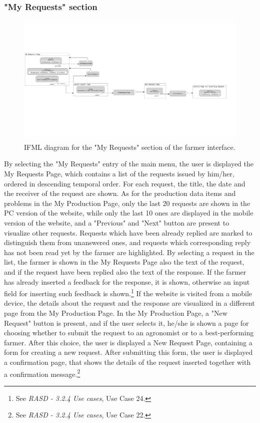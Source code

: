 \documentclass{article}
\begin{document}
\subsubsection{"My Requests" section}
\begin{figure}[H]
    \centering
     \includegraphics[scale=0.1]{diagrams/ui diagrams/farmer/my requests.png} 
    \caption{IFML diagram for the "My Requests" section of the farmer interface.}
\end{figure}
By selecting the "My Requests" entry of the main menu, the user is displayed the My Requests Page, which contains a list of the requests issued by him/her, ordered in descending temporal order. For each request, the title, the date and the receiver of the request are shown. As for the production data items and problems in the My Production Page, only the last 20 requests are shown in the PC version of the website, while only the last 10 ones are displayed in the mobile version of the website, and a "Previous" and "Next" button are present to visualize other requests. Requests which have been already replied are marked to distinguish them from unanswered ones, and requests which corresponding reply has not been read yet by the farmer are highlighted. \newline
By selecting a request in the list, the farmer is shown in the My Requests Page also the text of the request, and if the request have been replied also the text of the response. If the farmer has already inserted a feedback for the response, it is shown, otherwise an input field for inserting such feedback is shown.\footnote{See \textit{RASD - 3.2.4 Use cases}, Use Case 24.} If the website is visited from a mobile device, the details about the request and the response are visualized in a different page from the My Production Page. \newline
In the My Production Page, a "New Request" button is present, and if the user selects it, he/she is shown a page for choosing whether to submit the request to an agronomist or to a best-performing farmer. After this choice, the user is displayed a New Request Page, containing a form for creating a new request. After submitting this form, the user is displayed a confirmation page, that shows the details of the request inserted together with a confirmation message.\footnote{See \textit{RASD - 3.2.4 Use cases}, Use Case 22.}
\end{document}
